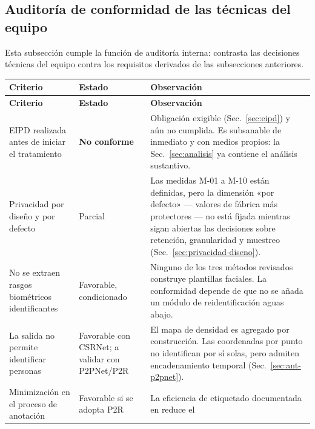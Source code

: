 \subsection{Auditoría de conformidad de las técnicas del equipo}
\label{sec:auditoria}

Esta subsección cumple la función de auditoría interna: contrasta las
decisiones técnicas del equipo contra los requisitos derivados de las
subsecciones anteriores.


{\footnotesize
\begin{longtable}{@{}L{3.6cm}L{2.0cm}L{6.4cm}@{}}
\toprule
\textbf{Criterio} & \textbf{Estado} & \textbf{Observación} \\
\midrule
\endfirsthead
\toprule
\textbf{Criterio} & \textbf{Estado} & \textbf{Observación} \\
\midrule
\endhead
\bottomrule
\endfoot
EIPD realizada antes de iniciar el tratamiento &
\textbf{No conforme} &
Obligación exigible (Sec.~\ref{sec:eipd}) y aún no cumplida. Es
subsanable de inmediato y con medios propios: la Sec.~\ref{sec:analisis}
ya contiene el análisis sustantivo. \\
\addlinespace
Privacidad por diseño y por defecto &
Parcial &
Las medidas M-01 a M-10 están definidas, pero la dimensión «por defecto»
--- valores de fábrica más protectores --- no está fijada mientras sigan
abiertas las decisiones sobre retención, granularidad y muestreo
(Sec.~\ref{sec:privacidad-diseno}). \\
\addlinespace
No se extraen rasgos biométricos identificantes &
Favorable, condicionado &
Ninguno de los tres métodos revisados construye plantillas faciales. La
conformidad depende de que no se añada un módulo de reidentificación
aguas abajo. \\
\addlinespace
La salida no permite identificar personas &
Favorable con CSRNet; a validar con P2PNet/P2R &
El mapa de densidad es agregado por construcción. Las coordenadas por
punto no identifican por sí solas, pero admiten encadenamiento temporal
(Sec.~\ref{sec:ant-p2pnet}). \\
\addlinespace
Minimización en el proceso de anotación &
Favorable si se adopta P2R &
La eficiencia de etiquetado documentada en \cite{Lin_2025_CVPR} reduce el

\end{longtable}}

